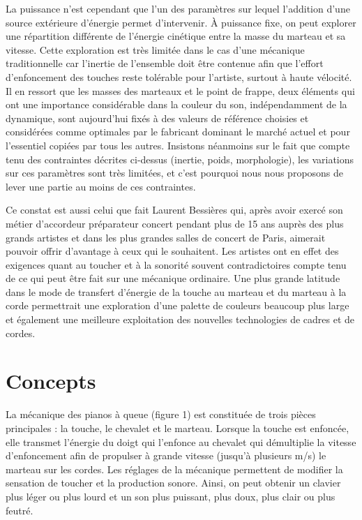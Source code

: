 \documentclass[french,a4paper,12pt]{report}
\begin{document}
La puissance n’est cependant que l’un des paramètres sur lequel l’addition d’une source extérieure d’énergie permet d’intervenir. À puissance fixe, on peut explorer une répartition différente de l’énergie cinétique entre la masse du marteau et sa vitesse. Cette exploration est très limitée dans le cas d’une mécanique traditionnelle car l’inertie de l’ensemble doit être contenue afin que l’effort d’enfoncement des touches reste tolérable pour l’artiste, surtout à haute vélocité. Il en ressort que les masses des marteaux et le point de frappe, deux éléments qui ont une importance considérable dans la couleur du son, indépendamment de la dynamique, sont aujourd’hui fixés à des valeurs de référence choisies et considérées comme optimales par le fabricant dominant le marché actuel et pour l’essentiel copiées par tous les autres. Insistons néanmoins sur le fait que compte tenu des contraintes décrites ci-dessus
(inertie, poids, morphologie), les variations sur ces paramètres sont très limitées, et c’est pourquoi nous nous proposons de lever une partie au moins de ces contraintes.

Ce constat est aussi celui que fait Laurent Bessières qui, après avoir exercé son métier d’accordeur préparateur concert pendant plus de 15 ans auprès des plus grands artistes et dans les plus grandes salles de concert de Paris, aimerait pouvoir offrir d’avantage à ceux qui le souhaitent. Les artistes ont en effet des exigences quant au toucher et à la sonorité souvent contradictoires compte tenu de ce qui peut être fait sur une mécanique ordinaire. Une plus grande latitude dans le mode de transfert d’énergie de la touche au marteau et du marteau à la corde permettrait une exploration d’une palette de couleurs beaucoup plus large et également une meilleure exploitation des nouvelles technologies de cadres et de cordes.

\section{Concepts} 

La mécanique des pianos à queue (figure 1) est constituée de trois pièces principales : la touche, le chevalet et le marteau. Lorsque la touche est enfoncée, elle transmet l’énergie du doigt qui l’enfonce au chevalet qui démultiplie la vitesse d’enfoncement afin de propulser à grande vitesse (jusqu’à plusieurs m/s) le marteau sur les cordes. Les réglages de la mécanique permettent de modifier la sensation de toucher et la production sonore. Ainsi, on peut obtenir un clavier plus léger ou plus lourd et un son plus puissant, plus doux, plus clair ou plus feutré.
\end{document}
